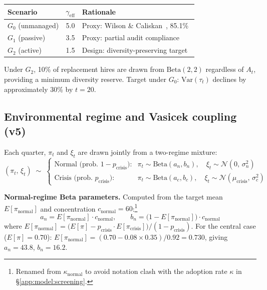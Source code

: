 \documentclass[11pt,a4paper]{article}
\begin{document}
\begin{appendices}
\begin{table}[H]
\centering\small
\setlength{\tabcolsep}{8pt}
\renewcommand{\arraystretch}{1.20}
\begin{tabular}{@{}lcl@{}}
\toprule
\textbf{Scenario} & $\gamma_{\text{eff}}$ & \textbf{Rationale} \\
\midrule
$G_0$ (unmanaged)   & 5.0 & Proxy: Wilson \& Caliskan~\cite{wilson_aies_2024}, 85.1\% \\
$G_1$ (passive)     & 3.5 & Proxy: partial audit compliance~\cite{wright_facct_2024} \\
$G_2$ (active)      & 1.5 & Design: diversity-preserving target~\cite{mann_pnas_2017} \\
\bottomrule
\end{tabular}
\end{table}

Under $G_2$, 10\% of replacement hires are drawn from
$\mathrm{Beta}(2,2)$ regardless of $A_t$, providing a minimum diversity
reserve. Target under $G_0$: $\text{Var}(\tau_t)$ declines by approximately
30\% by $t = 20$.

\subsection{Environmental regime and Vasicek coupling
(v5)}\label{app:model:regime}

Each quarter, $\pi_t$ and $\xi_t$ are drawn jointly from a two-regime
mixture:
\[
(\pi_t,\,\xi_t) \;\sim\;
\begin{cases}
  \text{Normal (prob.\ } 1{-}p_{\text{crisis}}\text{):} &
    \pi_t \sim \mathrm{Beta}(a_n,b_n),\quad
    \xi_t \sim \mathcal{N}(0,\,\sigma_n^2) \\[6pt]
  \text{Crisis (prob.\ } p_{\text{crisis}}\text{):} &
    \pi_t \sim \mathrm{Beta}(a_c,b_c),\quad
    \xi_t \sim \mathcal{N}(\mu_{\text{crisis}},\,\sigma_c^2)
\end{cases}
\]

\textbf{Normal-regime Beta parameters.} Computed from the target mean
$E[\pi_{\text{normal}}]$ and concentration
$c_{\text{normal}} = 60$:\footnote{Renamed from
$\kappa_{\text{normal}}$ to avoid notation clash with the adoption rate
$\kappa$ in \S\ref{app:model:screening}.}
\[
  a_n = E[\pi_{\text{normal}}] \cdot c_{\text{normal}}, \qquad
  b_n = \bigl(1 - E[\pi_{\text{normal}}]\bigr) \cdot c_{\text{normal}}
\]
where
$E[\pi_{\text{normal}}]
  = \bigl(E[\pi] - p_{\text{crisis}} \cdot E[\pi_{\text{crisis}}]\bigr)
    \big/ (1 - p_{\text{crisis}})$.
For the central case ($E[\pi] = 0.70$):
$E[\pi_{\text{normal}}] = (0.70 - 0.08 \times 0.35)/0.92 = 0.730$,
giving $a_n = 43.8$, $b_n = 16.2$.


\end{appendices}
\end{document}
